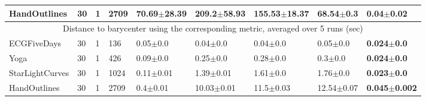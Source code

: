 \begin{table*}[t]
\begin{tabular}{lllllllll}
HandOutlines    & 30            & 1           & 2709   & 70.69$\pm$28.39 & 209.2$\pm$58.93 & 155.53$\pm$18.37 & 68.54$\pm$0.3  & \textbf{0.04$\pm$0.02}   \\ \midrule
\multicolumn{9}{c}{Distance to barycenter using the corresponding metric, averaged over 5 runs (sec)}                                                       \\ \midrule 
ECGFiveDays     & 30            & 1           & 136    & 0.05$\pm$0.0    & 0.04$\pm$0.0    & 0.04$\pm$0.0     & 0.05$\pm$0.0   & \textbf{0.024$\pm$0.0}   \\
Yoga            & 30            & 1           & 426    & 0.09$\pm$0.0    & 0.25$\pm$0.0    & 0.28$\pm$0.0     & 0.3$\pm$0.0    & \textbf{0.024$\pm$0.0}   \\
StarLightCurves & 30            & 1           & 1024   & 0.11$\pm$0.01   & 1.39$\pm$0.01   & 1.61$\pm$0.0     & 1.76$\pm$0.0   & \textbf{0.023$\pm$0.0}   \\
HandOutlines    & 30            & 1           & 2709   & 0.4$\pm$0.01    & 10.03$\pm$0.01  & 11.5$\pm$0.03    & 12.54$\pm$0.07 & \textbf{0.045$\pm$0.002} \\
\bottomrule
\end{tabular}%
\end{table*}